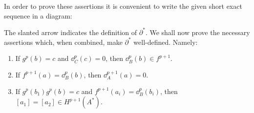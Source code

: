 In order to prove these assertions it is convenient to write the given short exact
sequence in a diagram:


\begin{center}
\end{center}

The slanted arrow indicates the definition of $\partial^*$. We shall now prove the necessary
assertions which, when combined, make $\partial^*$ well-defined. Namely:
\begin{enumerate}[label=(\roman*)]
  \item If $g^p(b) = c$  and $\dd^p_C(c) = 0$, then $\dd^p_B(b) \in f^{p+1}$.
  \item If $f^{p+1}(a) = \dd^p_B(b)$, then $\dd^{p+1}_A(a) = 0$.
  \item If $g^p(b_1)  g^p(b) = c$ and $f^{p+1}(a_i) = \dd^p_B(b_i)$, then $[a_1]=[a_2] \in H^{p+1}(A^*)$.
\end{enumerate}